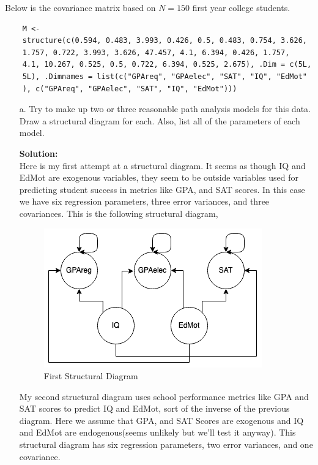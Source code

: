 \documentclass[12pt]{article}
\makeatletter
\theoremstyle{homework}
\newenvironment{exercise}[1]
{\def\@currentlabel{#1}\exercisecore}
{\endexercisecore}
\newcommand{\localhead}[1]{\par\smallskip\noindent\textbf{#1}\nobreak\\}%
\newcommand\solution{\localhead{Solution:}}
\makeatother
\begin{document}
\begin{exercise}{3} Below is the covariance matrix based on $N = 150$ first year college students.  

  \begin{footnotesize}
  \begin{verbatim}
    M <-
    structure(c(0.594, 0.483, 3.993, 0.426, 0.5, 0.483, 0.754, 3.626,
    1.757, 0.722, 3.993, 3.626, 47.457, 4.1, 6.394, 0.426, 1.757,
    4.1, 10.267, 0.525, 0.5, 0.722, 6.394, 0.525, 2.675), .Dim = c(5L,
    5L), .Dimnames = list(c("GPAreq", "GPAelec", "SAT", "IQ", "EdMot"
    ), c("GPAreq", "GPAelec", "SAT", "IQ", "EdMot")))
  \end{verbatim}
  \end{footnotesize}
  \begin{enumerate}
    \item[a.] Try to make up two or three reasonable path analysis models for this data. Draw a structural diagram for each. Also, list 
    all of the parameters of each model.\\
    \solution Here is my first attempt at a structural diagram. It seems as though IQ and EdMot are exogenous variables, they seem to be outside variables 
    used for predicting student success in metrics like GPA, and SAT scores. In this case we have six regression parameters, three error variances, and three covariances. This is 
    the following structural diagram, 
    \begin{figure}[H]
      \begin{center}
        \caption{First Structural Diagram}
      \includegraphics[width = .65\textwidth]{FirstDiagram.png}
      \end{center}
    \end{figure}
    My second structural diagram uses school performance metrics like GPA and SAT scores to predict IQ and EdMot, sort of the inverse of the previous diagram. Here we assume that 
    GPA, and SAT Scores are exogenous and IQ and EdMot are endogenous(seems unlikely but we'll test it anyway). This structural diagram has six regression parameters, two error variances, and one covariance. 

\end{enumerate}
\end{exercise}
\end{document}
